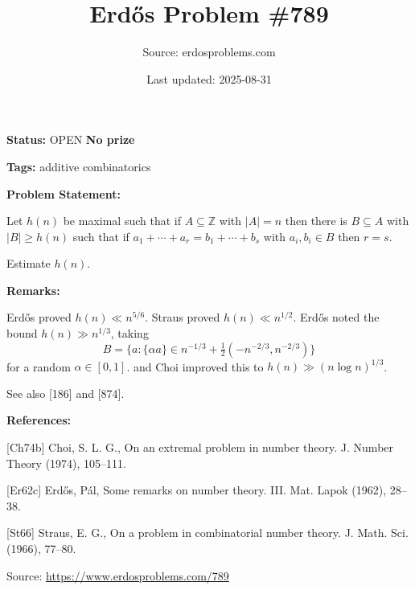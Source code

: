 \documentclass{article}
\title{Erd\H{o}s Problem \#789}
\date{Last updated: 2025-08-31}
\author{Source: erdosproblems.com}
\begin{document}
\maketitle

\noindent\textbf{Status:} OPEN \quad \textbf{No prize}

\noindent\textbf{Tags:} additive combinatorics

\medskip
\noindent\textbf{Problem Statement:}

Let $h(n)$ be maximal such that if $A\subseteq \mathbb{Z}$ with $\lvert A\rvert=n$ then there is $B\subseteq A$ with $\lvert B\rvert \geq h(n)$ such that if $a_1+\cdots+a_r=b_1+\cdots+b_s$ with $a_i,b_i\in B$ then $r=s$.

Estimate $h(n)$.

\bigskip
\noindent\textbf{Remarks:}

Erd\H{o}s \cite{Er62c} proved $h(n) \ll n^{5/6}$. Straus \cite{St66} proved $h(n) \ll n^{1/2}$. Erd\H{o}s noted the bound $h(n)\gg n^{1/3}$, taking\[B=\{ a: \{ \alpha a\} \in n^{-1/3}+\tfrac{1}{2} (-n^{-2/3},n^{-2/3})\}\]for a random $\alpha\in [0,1]$. \cite{Er62c} and Choi \cite{Ch74b} improved this to $h(n) \gg (n\log n)^{1/3}$.

See also [186] and [874].

\bigskip
\noindent\textbf{References:}

[Ch74b] Choi, S. L. G., On an extremal problem in number theory. J. Number Theory (1974), 105--111.
 
 [Er62c] Erd\H{o}s, P\'{a}l, Some remarks on number theory. {III}. Mat. Lapok (1962), 28--38.
 
 [St66] Straus, E. G., On a problem in combinatorial number theory. J. Math. Sci. (1966), 77--80.

\bigskip
\noindent\small{Source: \url{https://www.erdosproblems.com/789}}
\end{document}
